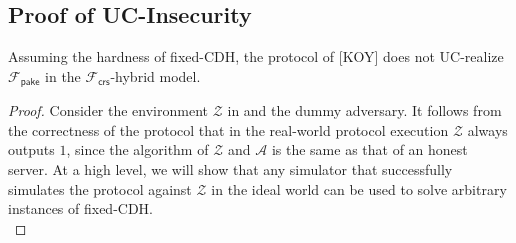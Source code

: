 \documentclass[12pt,a4paper]{article}
\newcommand{\env}{\mathcal{Z}}
\newcommand{\adv}{\mathcal{A}}
\begin{document}
	\subsection{Proof of UC-Insecurity}

	\begin{theorem}
		Assuming the hardness of fixed-CDH, the protocol of [KOY] does not UC-realize $\mathcal{F}_\mathsf{pake}$ in the $\mathcal{F}_{\mathsf{crs}}$-hybrid model.
	\end{theorem}

	\begin{proof}
	
	Consider the environment $\env$ in  and the dummy adversary. It follows from the correctness of the protocol that in the real-world protocol execution $\env$ always outputs $1$, since the algorithm of $\env$ and $\adv$ is the same as that of an honest server. At a high level, we will show that any simulator that successfully simulates the protocol against $\env$ in the ideal world can be used to solve arbitrary instances of fixed-CDH.\\
	

\end{proof}
\end{document}
